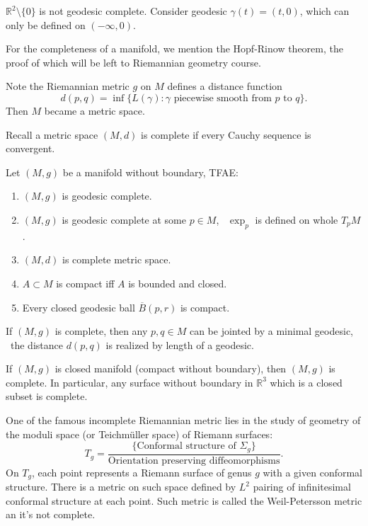 \begin{example}
    \(\mathbb{R}^2\setminus\{0\}\) is not geodesic complete. Consider geodesic
    \(\gamma(t)=(t,0)\), which can only be defined on \((-\infty,0)\).
\end{example}

For the completeness of a manifold, we mention the Hopf-Rinow theorem, the proof of
which will be left to Riemannian geometry course.

Note the Riemannian metric \(g\) on \(M\) defines a distance function \[
    d(p,q)=\inf\{L(\gamma):\gamma\text{ piecewise smooth from } p \text{ to }q\}
.\] Then \(M\) became a metric space.

Recall a metric space \((M,d)\) is complete if every Cauchy sequence is convergent.

\begin{theorem}\label{thm:hopf-rinow}
    Let \((M,g)\) be a manifold without boundary, TFAE\@:
    \begin{enumerate}[(1)]
    \item \((M,g)\) is geodesic complete.
    \item \((M,g)\) is geodesic complete at some \(p\in M\), \ie\ \(\exp_p\) is defined
        on whole \(T_p M\).
    \item \((M,d)\) is complete metric space.
    \item \(A\subset M\) is compact iff \(A\) is bounded and closed.
    \item Every closed geodesic ball \(\overline{B}(p,r)\) is compact.
    \end{enumerate}
\end{theorem}

\begin{corollary}
    If \((M,g)\) is complete, then any \(p,q\in M\) can be jointed by a minimal
    geodesic, \ie\ the distance \(d(p,q)\) is realized by length of a geodesic.
\end{corollary}
\begin{corollary}
    If \((M,g)\) is closed manifold (compact without boundary), then \((M,g)\) is
    complete. In particular, any surface without boundary in \(\mathbb{R}^3\) which is
    a closed subset is complete.
\end{corollary}

\begin{remark}
    One of the famous incomplete Riemannian metric lies in the study of geometry of
    the moduli space (or Teichm\"uller space) of Riemann surfaces: \[
        T_g=\frac{\{\text{Conformal structure of }\Sigma_g\}}{\text{Orientation
        preserving diffeomorphisms}}
    .\] On \(T_g\), each point represents a Riemann surface of genus  \(g\) with a
    given conformal structure. There is a metric on such space defined by \(L^2\)
    pairing of infinitesimal conformal structure at each point. Such metric is called
    the Weil-Petersson metric an it's not complete.
\end{remark}


